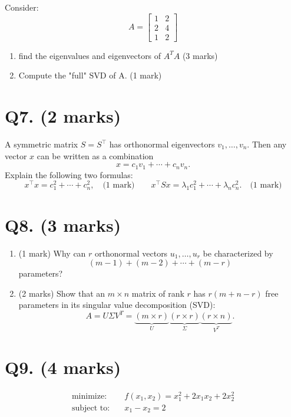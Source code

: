 \documentclass[11pt]{article}
\begin{document}
Consider:
\[
A = 
\begin{bmatrix}
 1 & 2 \\ 2 & 4 \\ 1 & 2
\end{bmatrix}
\]

\begin{enumerate}
    \item find the eigenvalues and eigenvectors of \(A^TA\) (3 marks)
    \item Compute the "full" SVD of A. (1 mark)
\end{enumerate}

\section*{Q7. (2 marks)}
A symmetric matrix $S = S^\top$ has orthonormal eigenvectors $v_1, \dots, v_n$. Then any vector $x$ can be written as a combination
\[
x = c_1 v_1 + \cdots + c_n v_n. 
\]
Explain the following two formulas:
\[
x^\top x = c_1^2 + \cdots + c_n^2,
\quad \text{(1 mark)} \qquad 
x^\top Sx = \lambda_1 c_1^2 + \cdots + \lambda_n c_n^2. \quad \text{(1 mark)}
\]





\section*{Q8. (3 marks)}

\begin{enumerate}
    \item (1 mark)  Why can $r$ orthonormal vectors $u_{1}, \dots, u_{r}$ be   characterized by
\[
(m-1) + (m-2) + \cdots + (m-r)
\]
parameters?
    \item (2 marks) Show that an $m \times n$ matrix of rank $r$ has $r(m+n-r)$ free parameters in its singular value decomposition (SVD):
\[
A = U \Sigma V^{T} 
= \underbrace{(m \times r)}_{U} 
\underbrace{(r \times r)}_{\Sigma} 
\underbrace{(r \times n)}_{V^{T}}.
\]

\end{enumerate}

\section*{Q9. (4 marks)}

\[
\begin{aligned}
\text{minimize:} \quad & f(x_1,x_2) = x_1^2 + 2x_1x_2 + 2x_2^2 \\[6pt]
\text{subject to:} \quad & x_1 - x_2 = 2
\end{aligned}
\]
\end{document}
